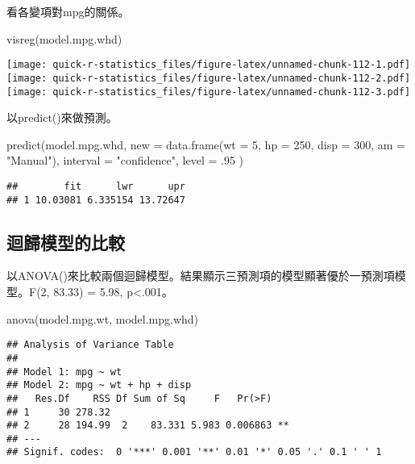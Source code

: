 \documentclass[
]{book}
\newenvironment{Shaded}{\begin{snugshade}}{\end{snugshade}}
\newcommand{\AttributeTok}[1]{\textcolor[rgb]{0.77,0.63,0.00}{#1}}
\newcommand{\DecValTok}[1]{\textcolor[rgb]{0.00,0.00,0.81}{#1}}
\newcommand{\FunctionTok}[1]{\textcolor[rgb]{0.00,0.00,0.00}{#1}}
\newcommand{\NormalTok}[1]{#1}
\newcommand{\StringTok}[1]{\textcolor[rgb]{0.31,0.60,0.02}{#1}}
\begin{document}
看各變項對mpg的關係。

\begin{Shaded}
\begin{Highlighting}[]
\FunctionTok{visreg}\NormalTok{(model.mpg.whd)}
\end{Highlighting}
\end{Shaded}

\texttt{[image: quick-r-statistics\_files/figure-latex/unnamed-chunk-112-1.pdf]} \texttt{[image: quick-r-statistics\_files/figure-latex/unnamed-chunk-112-2.pdf]} \texttt{[image: quick-r-statistics\_files/figure-latex/unnamed-chunk-112-3.pdf]}

以predict()來做預測。

\begin{Shaded}
\begin{Highlighting}[]
\FunctionTok{predict}\NormalTok{(model.mpg.whd,}
        \AttributeTok{new =} \FunctionTok{data.frame}\NormalTok{(}\AttributeTok{wt =} \DecValTok{5}\NormalTok{, }\AttributeTok{hp =} \DecValTok{250}\NormalTok{, }\AttributeTok{disp =} \DecValTok{300}\NormalTok{, }\AttributeTok{am =} \StringTok{"Manual"}\NormalTok{),}
        \AttributeTok{interval =} \StringTok{"confidence"}\NormalTok{,}
        \AttributeTok{level =}\NormalTok{ .}\DecValTok{95}
\NormalTok{)}
\end{Highlighting}
\end{Shaded}

\begin{verbatim}
##        fit      lwr      upr
## 1 10.03081 6.335154 13.72647
\end{verbatim}

\hypertarget{ux8ff4ux6b78ux6a21ux578bux7684ux6bd4ux8f03}{%
\subsection{迴歸模型的比較}\label{ux8ff4ux6b78ux6a21ux578bux7684ux6bd4ux8f03}}

以ANOVA()來比較兩個迴歸模型。結果顯示三預測項的模型顯著優於一預測項模型。F(2, 83.33) = 5.98, p\textless.001。

\begin{Shaded}
\begin{Highlighting}[]
\FunctionTok{anova}\NormalTok{(model.mpg.wt, model.mpg.whd)}
\end{Highlighting}
\end{Shaded}

\begin{verbatim}
## Analysis of Variance Table
## 
## Model 1: mpg ~ wt
## Model 2: mpg ~ wt + hp + disp
##   Res.Df    RSS Df Sum of Sq     F   Pr(>F)   
## 1     30 278.32                               
## 2     28 194.99  2    83.331 5.983 0.006863 **
## ---
## Signif. codes:  0 '***' 0.001 '**' 0.01 '*' 0.05 '.' 0.1 ' ' 1
\end{verbatim}
\end{document}

